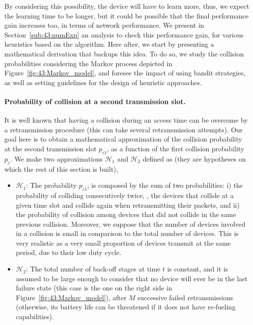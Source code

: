 By considering this possibility, the device will have to learn more, thus, we expect the learning time to be longer, but it could be possible that the final performance gain increases too, in terms of network performance.
We present in Section~\ref{sub:43:numExp} an analysis to check this performance gain, for various heuristics based on the \UCB{} algorithm.
%
Here after, we start by presenting a mathematical derivation that backups this idea.
To do so, we study the collision probabilities considering the Markov process depicted in Figure~\ref{fig:43:Markov_model}, and foresee the impact of using bandit strategies, as well as setting guidelines for the design of heuristic approaches.


\paragraph{Probability of collision at a second transmission slot.}

It is well known \cite{Abramson1970,Roberts75}
that having a collision during an access time can be overcome by a retransmission procedure (this can take several retransmission attempts).
Our goal here is to obtain a mathematical approximation of the collision probability at the second transmission slot $p_{c1}$, as a function of the first collision probability $p_{c}$.
%
We make two approximations $\mathcal{H}_{1}$ and $\mathcal{H}_{2}$ defined as (they are hypotheses on which the rest of this section is built),
\begin{itemize}
	\item $\mathcal{H}_{1}$:
    The probability $p_{c1}$, is composed by the sum of two probabilities: i)
    the probability of colliding consecutively twice, \ie, the devices that collide at a given time slot and collide again when retransmitting their packets,
	and ii) the probability of collision among devices that did not collide in the same previous collision. Moreover, we suppose that the number of devices involved in a collision is small in comparison to the total number of devices.
	This is very realistic as a very small proportion of devices transmit at the same period, due to their low duty cycle.

	\item $\mathcal{H}_{2}$:
	The total number of back-off stages at time $t$ is constant, and it is assumed to be large enough to consider that no device will ever be in the last failure state (this case is the one on the right side in Figure~\ref{fig:43:Markov_model}), after $M$ successive failed retransmissions
	(otherwise, its battery life can be threatened if it does not have re-fueling capabilities).
\end{itemize}

